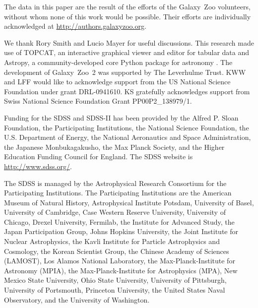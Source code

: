 \documentclass[useAMS,usenatbib]{mn2e}
\begin{document}
The data in this paper are the result of the efforts of the Galaxy~Zoo volunteers, without whom none of this work would be possible. Their efforts are individually acknowledged at \url{http://authors.galaxyzoo.org}. 

We thank Rory Smith and Lucio Mayer for useful discussions. This research made use of TOPCAT, an interactive graphical viewer and editor for tabular data \citep{tay05} and Astropy, a community-developed core Python package for astronomy \citep{ast13}. The development of Galaxy~Zoo~2 was supported by The Leverhulme Trust. KWW and LFF would like to acknowledge support from the US National Science Foundation under grant DRL-0941610. KS gratefully acknowledges support from Swiss National Science Foundation Grant PP00P2\_138979/1.

Funding for the SDSS and SDSS-II has been provided by the Alfred P. Sloan Foundation, the Participating Institutions, the National Science Foundation, the U.S. Department of Energy, the National Aeronautics and Space Administration, the Japanese Monbukagakusho, the Max Planck Society, and the Higher Education Funding Council for England. The SDSS website is \url{http://www.sdss.org/}.

The SDSS is managed by the Astrophysical Research Consortium for the Participating Institutions. The Participating Institutions are the American Museum of Natural History, Astrophysical Institute Potsdam, University of Basel, University of Cambridge, Case Western Reserve University, University of Chicago, Drexel University, Fermilab, the Institute for Advanced Study, the Japan Participation Group, Johns Hopkins University, the Joint Institute for Nuclear Astrophysics, the Kavli Institute for Particle Astrophysics and Cosmology, the Korean Scientist Group, the Chinese Academy of Sciences (LAMOST), Los Alamos National Laboratory, the Max-Planck-Institute for Astronomy (MPIA), the Max-Planck-Institute for Astrophysics (MPA), New Mexico State University, Ohio State University, University of Pittsburgh, University of Portsmouth, Princeton University, the United States Naval Observatory, and the University of Washington.



\end{document}
